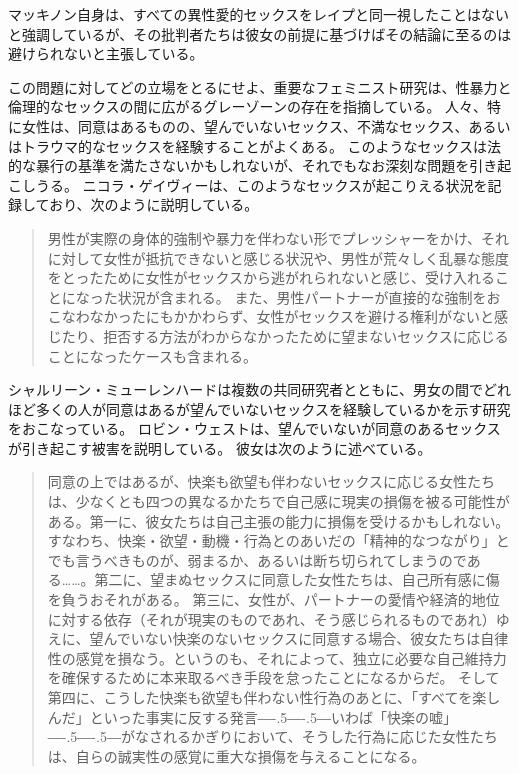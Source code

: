 \documentclass[paper=a4,book,openany]{jlreq}
\newcommand{\ig}[1]{}           %
\def\DDASH{―\kern-.5\zw―\kern-.5\zw―} %
\begin{document}
マッキノン自身は、すべての異性愛的セックスをレイプと同一視したことはないと強調しているが、その批判者たちは彼女の前提に基づけばその結論に至るのは避けられないと主張している。

この問題に対してどの立場をとるにせよ、重要なフェミニスト研究は、性暴力と倫理的なセックスの間に広がるグレーゾーンの存在を指摘している。
人々、特に女性は、同意はあるものの、望んでいないセックス、不満なセックス、あるいはトラウマ的なセックスを経験することがよくある。
このようなセックスは法的な暴行の基準を満たさないかもしれないが、それでもなお深刻な問題を引き起こしうる。
ニコラ・ゲイヴィーは、このようなセックスが起こりえる状況を記録しており、次のように説明している。

\begin{quote}
男性が実際の身体的強制や暴力を伴わない形でプレッシャーをかけ、それに対して女性が抵抗できないと感じる状況や、男性が荒々しく乱暴な態度をとったために女性がセックスから逃がれられないと感じ、受け入れることになった状況が含まれる。
また、男性パートナーが直接的な強制をおこなわなかったにもかかわらず、女性がセックスを避ける権利がないと感じたり、拒否する方法がわからなかったために望まないセックスに応じることになったケースも含まれる。
\citep[p.136]{gavey04:_just_sex}
\end{quote}

シャルリーン・ミューレンハードは複数の共同研究者とともに、男女の間でどれほど多くの人が同意はあるが望んでいないセックスを経験しているかを示す研究をおこなっている\citep[cf.][]{muehlenhard05:_wantin_not_wantin_sex,peterson07:_concep_wanted_women_consen_noncon_sexual_exper}。
ロビン・ウェスト\ig{Robin West}は、望んでいないが同意のあるセックスが引き起こす被害を説明している。
彼女は次のように述べている。

\begin{quote}
同意の上ではあるが、快楽も欲望も伴わないセックスに応じる女性たちは、少なくとも四つの異なるかたちで自己感に現実の損傷を被る可能性がある。第一に、彼女たちは自己主張の能力に損傷を受けるかもしれない。すなわち、快楽・欲望・動機・行為とのあいだの「精神的なつながり」とでも言うべきものが、弱まるか、あるいは断ち切られてしまうのである……。第二に、望まぬセックスに同意した女性たちは、自己所有感に傷を負うおそれがある。
第三に、女性が、パートナーの愛情や経済的地位に対する依存（それが現実のものであれ、そう感じられるものであれ）ゆえに、望んでいない快楽のないセックスに同意する場合、彼女たちは自律性の感覚を損なう。というのも、それによって、独立に必要な自己維持力を確保するために本来取るべき手段を怠ったことになるからだ。
そして第四に、こうした快楽も欲望も伴わない性行為のあとに、「すべてを楽しんだ」といった事実に反する発言{\DDASH}いわば「快楽の嘘」{\DDASH}がなされるかぎりにおいて、そうした行為に応じた女性たちは、自らの誠実性の感覚に重大な損傷を与えることになる。\citep[p.53]{west95:_harms_of_consen_sex}
\end{quote}
\end{document}
